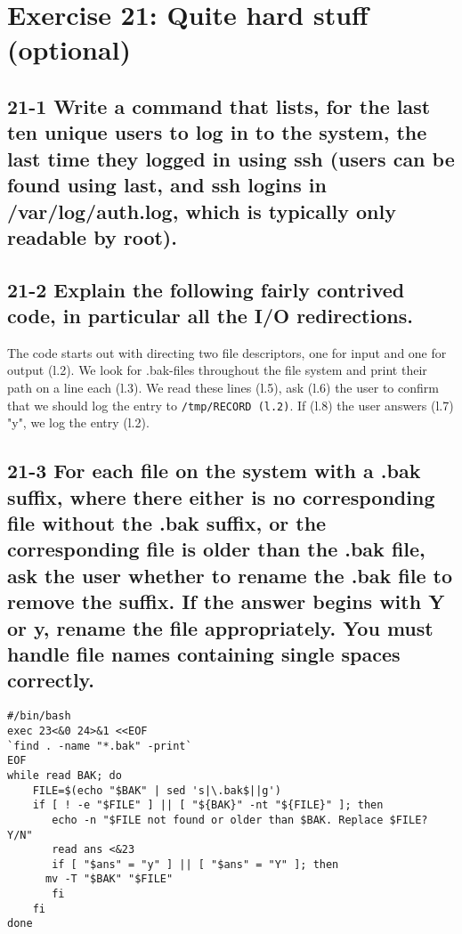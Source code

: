 \section{Exercise 21: Quite hard stuff (optional)}
\subsection{21-1 Write a command that lists, for the last ten unique users to log in to the system, the last time they logged in using ssh (users can be found using last, and ssh logins in /var/log/auth.log, which is typically only readable by root).}

\subsection{21-2 Explain the following fairly contrived code, in particular all the I/O redirections.}
The code starts out with directing two file descriptors, one for input and one for output (l.2). We look for .bak-files throughout the file system and print their path on a line each (l.3). We read these lines (l.5), ask (l.6) the user to confirm that we should log the entry to \verb=/tmp/RECORD (l.2)=. If (l.8) the user answers (l.7) "y", we log the entry (l.2).

\subsection{21-3 For each file on the system with a .bak suffix, where there either is no corresponding file without the .bak suffix, or the corresponding file is older than the .bak file, ask the user whether to rename the .bak file to remove the suffix. If the answer begins with Y or y, rename the file appropriately. You must handle file names containing single spaces correctly.}
\begin{verbatim}
#/bin/bash
exec 23<&0 24>&1 <<EOF
`find . -name "*.bak" -print`
EOF
while read BAK; do
    FILE=$(echo "$BAK" | sed 's|\.bak$||g')
    if [ ! -e "$FILE" ] || [ "${BAK}" -nt "${FILE}" ]; then
       echo -n "$FILE not found or older than $BAK. Replace $FILE? Y/N"
       read ans <&23
       if [ "$ans" = "y" ] || [ "$ans" = "Y" ]; then
	  mv -T "$BAK" "$FILE"
       fi
    fi
done
\end{verbatim}


